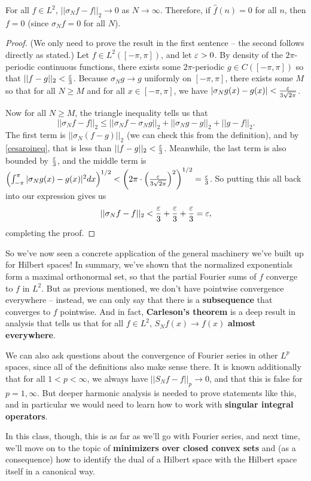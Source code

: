 \begin{theorem}
For all $f \in L^2$, $||\sigma_N f - f||_2 \to 0$ as $N \to \infty$. Therefore, if $\hat{f}(n) = 0$ for all $n$, then $f = 0$ (since $\sigma_N f = 0$ for all $N$).
\end{theorem}
\begin{proof}
(We only need to prove the result in the first sentence -- the second follows directly as stated.) Let $f \in L^2([-\pi, \pi])$, and let $\varepsilon > 0$. By density of the $2\pi$-periodic continuous functions, there exists some $2\pi$-periodic $g \in C([-\pi, \pi])$ so that $||f-g||_2 < \frac{\varepsilon}{3}$. Because $\sigma_N g \to g$ uniformly on $[-\pi, \pi]$, there exists some $M$ so that for all $N \ge M$ and for all $x \in [-\pi, \pi]$, we have $|\sigma_Ng(x) - g(x)| < \frac{\varepsilon}{3\sqrt{2\pi}}$.  

Now for all $N \ge M$, the triangle inequality tells us that
\[
    ||\sigma_Nf - f||_2 \le ||\sigma_N f - \sigma_N g||_2 + ||\sigma_N g - g||_2 + ||g - f||_2.
\]
The first term is $||\sigma_N(f-g)||_2$ (we can check this from the definition), and by \cref{cesaroineq}, that is less than $||f-g||_2 < \frac{\varepsilon}{3}$. Meanwhile, the last term is also bounded by $\frac{\varepsilon}{3}$, and the middle term is $\left(\int_{-\pi}^{\pi} |\sigma_N g(x) - g(x) |^2 dx \right)^{1/2} < \left(2\pi \cdot\left(\frac{\varepsilon}{3\sqrt{2\pi}}\right)^2\right)^{1/2} = \frac{\varepsilon}{3}$. So putting this all back into our expression gives us
\[
     ||\sigma_Nf - f||_2 < \frac{\varepsilon}{3} + \frac{\varepsilon}{3} + \frac{\varepsilon}{3} = \varepsilon,
\]
completing the proof.
\end{proof}

So we've now seen a concrete application of the general machinery we've built up for Hilbert spaces! In summary, we've shown that the normalized exponentials form a maximal orthonormal set, so that the partial Fourier sums of $f$ converge to $f$ in $L^2$. But as previous mentioned, we don't have pointwise convergence everywhere -- instead, we can only say that there is a \textbf{subsequence} that converges to $f$ pointwise. And in fact, \textbf{Carleson's theorem }is a deep result in analysis that tells us that for all $f \in L^2$, $S_Nf(x) \to f(x)$ \textbf{almost everywhere}.

We can also ask questions about the convergence of Fourier series in other $L^p$ spaces, since all of the definitions also make sense there. It is known additionally that for all $1 < p < \infty$, we always have $||S_N f - f||_p \to 0$, and that this is false for $p = 1, \infty$. But deeper harmonic analysis is needed to prove statements like this, and in particular we would need to learn how to work with \textbf{singular integral operators}.

In this class, though, this is as far as we'll go with Fourier series, and next time, we'll move on to the topic of \textbf{minimizers over closed convex sets} and (as a consequence) how to identify the dual of a Hilbert space with the Hilbert space itself in a canonical way. 